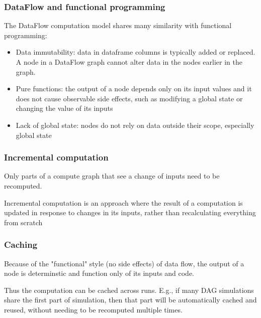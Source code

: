 \documentclass[11pt, reqno]{amsart}
\theoremstyle{definition}
\theoremstyle{remark}
\begin{document}
\subsubsection{DataFlow and functional programming}

The DataFlow computation model shares many similarity with functional
programming:

\begin{itemize}
  \item Data immutability: data in dataframe columns is typically added or
        replaced. A node in a DataFlow graph cannot alter data in the nodes
        earlier in the graph.
  \item Pure functions: the output of a node depends only on its input values
        and it does not cause observable side effects, such as modifying a global
        state or changing the value of its inputs
  \item Lack of global state: nodes do not rely on data outside their scope,
        especially global state
\end{itemize}

\subsubsection{Incremental computation}

Only parts of a compute graph that see a change of inputs need to be recomputed.

Incremental computation is an approach where the result of a computation is
updated in response to changes in its inputs, rather than recalculating
everything from scratch

\subsubsection{Caching}

Because of the "functional" style (no side effects) of data flow, the output of
a node is determinstic and function only of its inputs and code.

Thus the computation can be cached across runs. E.g., if many DAG simulations
share the first part of simulation, then that part will be automatically cached
and reused, without needing to be recomputed multiple times.
\end{document}
